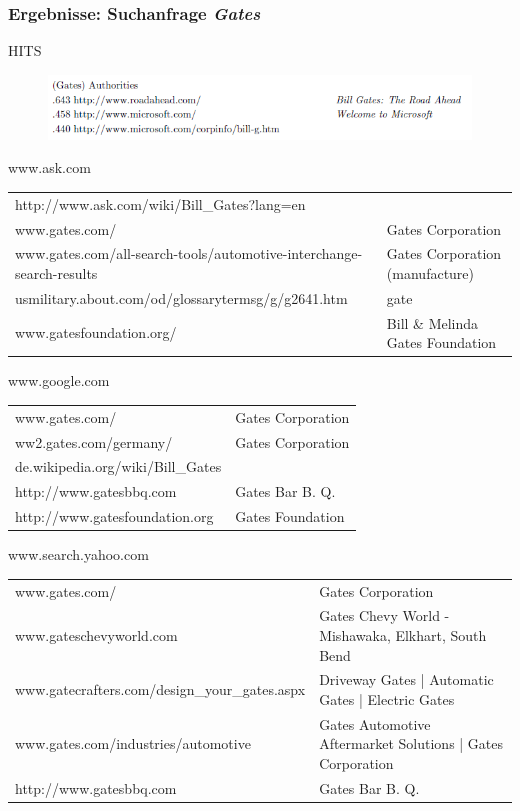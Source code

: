 \documentclass[hyperref={pdfpagelabels=false}]{beamer}
\begin{document}
\begin{frame} [allowframebreaks]
\frametitle{Ergebnisse: Suchanfrage {\it\glqq Gates\grqq} }
\fontsize{6pt}{7.2}\selectfont

\begin{block}{HITS \cite{Kleinberg}}
	\begin{figure} [th]
		\includegraphics[scale=0.3]{gates.png} 
	\end{figure}
\end{block}
\begin{block}{www.ask.com}
	\begin{tabular}{l l}
		http://www.ask.com/wiki/Bill\_Gates?lang=en & \\
		www.gates.com/ & Gates Corporation \\
		www.gates.com/all-search-tools/automotive-interchange-search-results & Gates Corporation (manufacture)\\
		usmilitary.about.com/od/glossarytermsg/g/g2641.htm & gate \\
		www.gatesfoundation.org/ & Bill \& Melinda Gates Foundation \\
	\end{tabular}
\end{block}
\begin{block}{www.google.com}
	\begin{tabular}{l l}
		www.gates.com/ & Gates Corporation \\
		ww2.gates.com/germany/ & Gates Corporation\\
		de.wikipedia.org/wiki/Bill\_Gates & \\
		http://www.gatesbbq.com	& Gates Bar B. Q. \\
		http://www.gatesfoundation.org & Gates Foundation \\
	\end{tabular}
\end{block}

\begin{block}{www.search.yahoo.com}
	\begin{tabular}{l l}
		www.gates.com/ & Gates Corporation \\
		www.gateschevyworld.com & Gates Chevy World - Mishawaka, Elkhart, South Bend\\
		www.gatecrafters.com/design\_your\_gates.aspx & Driveway Gates | Automatic Gates | Electric Gates \\
		www.gates.com/industries/automotive & Gates Automotive Aftermarket Solutions | Gates Corporation \\
		http://www.gatesbbq.com	& Gates Bar B. Q. \\
	\end{tabular}
\end{block}
\end{frame}
\end{document}
